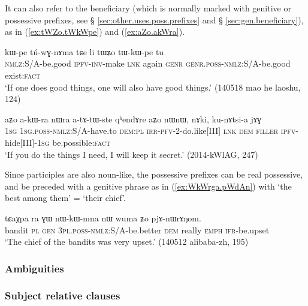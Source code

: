 It can also refer to the beneficiary (which is normally marked with genitive or possessive prefixes, see § \ref{sec:other.uses.poss.prefixes} and § \ref{sec:gen.beneficiary}), as in (\ref{ex:tWZo.tWkWpe}) and (\ref{ex:aZo.akWra}).

 \begin{exe} 
\ex \label{ex:tWZo.tWkWpe}
\gll  kɯ-pe tú-wɣ-nɤma tɕe li tɯʑo tɯ-kɯ-pe tu \\
\textsc{nmlz}:S/A-be.good \textsc{ipfv}-\textsc{inv}-make \textsc{lnk} again \textsc{genr} \textsc{genr}.\textsc{poss}-\textsc{nmlz}:S/A-be.good exist:\textsc{fact} \\
\glt  `If one does good things, one will also have good things.' (140518 mao he laoshu, 124)
\end{exe}

 \begin{exe} 
\ex \label{ex:aZo.akWra}
\gll  aʑo a-kɯ-ra nɯra a-tɤ-tɯ-ste qʰendɤre aʑo nɯnɯ, nɤki, ku-nɤtsi-a jɤɣ \\
\textsc{1sg} \textsc{1sg}.\textsc{poss}-\textsc{nmlz}:S/A-have.to \textsc{dem}:\textsc{pl} \textsc{irr}-\textsc{pfv}-2-do.like[III] \textsc{lnk} \textsc{dem} \textsc{filler} \textsc{ipfv}-hide[III]-\textsc{1sg} be.possible:\textsc{fact}  \\
\glt  `If you do the things I need, I will keep it secret.'  (2014-kWlAG, 247)
\end{exe}

Since participles are also noun-like, the possessive prefixes can be real possessive, and be preceded with a genitive phrase as in (\ref{ex:WkWrga.pWdAn}) with  `the best among them' = `their chief'.

 \begin{exe} 
\ex \label{ex:WkWrga.pWdAn}
\gll tɕaχpa ra ɣɯ nɯ-kɯ-mna nɯ wuma ʑo pjɤ-nɯrɤŋom. \\
bandit \textsc{pl} \textsc{gen} \textsc{3pl}.\textsc{poss}-\textsc{nmlz}:S/A-be.better \textsc{dem} really \textsc{emph} \textsc{ifr}-be.upset \\
\glt `The chief of the bandits was very upset.' (140512 alibaba-zh, 195)
\end{exe}
\subsubsection{Ambiguities}  \label{ex:subject.participle.ambiguities}
\subsubsection{Subject relative clauses}  \label{ex:subject.participle.subject.relative}

